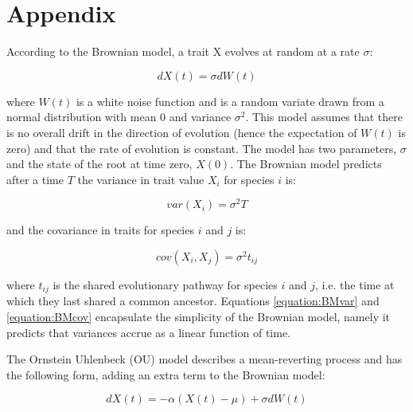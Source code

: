 \documentclass[a4paper,12pt]{article}
\begin{document}



\newpage
\section{Appendix}
  \label{section:models}
  \setcounter{equation}{0}

  According to the Brownian model, a trait X evolves at random at a rate $\sigma$:

    \begin{equation}
      dX(t) = \sigma dW(t)
      \label{equation:BMrate} 
    \end{equation}

  where $W(t)$ is a white noise function and is a random variate drawn from a normal distribution with mean $0$ and variance $\sigma^2$. 
  This model assumes that there is no overall drift in the direction of evolution (hence the expectation of $W(t)$ is zero) and that the rate of evolution is constant. 
  The model has two parameters, $\sigma$ and the state of the root at time zero, $X(0)$. 
  The Brownian model predicts after a time $T$ the variance in trait value $X_i$ for species $i$ is:

    \begin{equation}
      var(X_i) = \sigma^2 T
      \label{equation:BMvar} 
    \end{equation}

  and the covariance in traits for species $i$ and $j$ is:
  
    \begin{equation}
      cov(X_i,X_j) = \sigma^2 t_{ij}
      \label{equation:BMcov} 
    \end{equation}

  where $t_{ij}$ is the shared evolutionary pathway for species $i$ and $j$, i.e. the time at which they last shared a common ancestor. 
  Equations \ref{equation:BMvar} and \ref{equation:BMcov} encapsulate the simplicity of the Brownian model, namely it predicts that variances accrue as a linear function of time. 

  The Ornstein Uhlenbeck (OU) model describes a mean-reverting process and has the following form, adding an extra term to the Brownian model:

  \begin{equation}
    dX(t) = - \alpha (X(t) - \mu) + \sigma dW(t)
    \label{equation:OUrate} 
  \end{equation}
\end{document}
